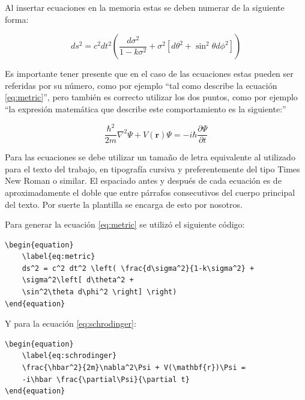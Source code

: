 Al insertar ecuaciones en la memoria estas se deben numerar de la siguiente forma:

\begin{equation}
	\label{eq:metric}
	ds^2 = c^2 dt^2 \left( \frac{d\sigma^2}{1-k\sigma^2} + \sigma^2\left[ d\theta^2 + \sin^2\theta d\phi^2 \right] \right)
\end{equation}
                                                        
Es importante tener presente que en el caso de las ecuaciones estas pueden ser referidas por su número, como por ejemplo ``tal como describe la ecuación \ref{eq:metric}'', pero también es correcto utilizar los dos puntos, como por ejemplo ``la expresión matemática que describe este comportamiento es la siguiente:''

\begin{equation}
	\label{eq:schrodinger}
	\frac{\hbar^2}{2m}\nabla^2\Psi + V(\mathbf{r})\Psi = -i\hbar \frac{\partial\Psi}{\partial t}
\end{equation}

Para las ecuaciones se debe utilizar un tamaño de letra equivalente al utilizado para el texto del trabajo, en tipografía cursiva y preferentemente del tipo Times New Roman o similar. El espaciado antes y después de cada ecuación es de aproximadamente el doble que entre párrafos consecutivos del cuerpo principal del texto. Por suerte la plantilla se encarga de esto por nosotros.

Para generar la ecuación \ref{eq:metric} se utilizó el siguiente código:

\begin{verbatim}
\begin{equation}
	\label{eq:metric}
	ds^2 = c^2 dt^2 \left( \frac{d\sigma^2}{1-k\sigma^2} + 
	\sigma^2\left[ d\theta^2 + 
	\sin^2\theta d\phi^2 \right] \right)
\end{equation}
\end{verbatim}

Y para la ecuación \ref{eq:schrodinger}:

\begin{verbatim}
\begin{equation}
	\label{eq:schrodinger}
	\frac{\hbar^2}{2m}\nabla^2\Psi + V(\mathbf{r})\Psi = 
	-i\hbar \frac{\partial\Psi}{\partial t}
\end{equation}

\end{verbatim}